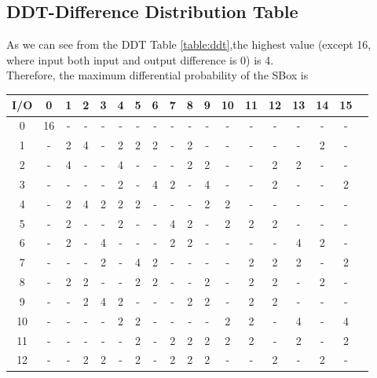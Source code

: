 \documentclass[preprint]{transcrypto}
\begin{document}
\subsection{DDT-Difference Distribution Table}
As we can see from the DDT Table \ref{table:ddt},the highest value (except 16, where input both input and output difference is 0) is 4.\\
Therefore, the maximum differential probability of the SBox is \\
\begin{table}[H]
	\begin{center}
	\begin{tabular}{||c||c|c|c|c|c|c|c|c|c|c|c|c|c|c|c|c|c|}
	    \hline
	    I/O & 0 & 1 & 2 & 3 & 4 & 5 & 6 & 7 & 8 & 9 & 10 & 11 & 12 & 13 & 14 & 15\\
		\hline
		\hline
		0 & 16 &  - &  - &  - &  - &  - &  - &  - &  - &  - &  - &  - &  - &  - &  - &  - \\
        \hline
        1 &  - & 2 & 4 &  - & 2 & 2 & 2 &  - & 2 &  - &  - &  - &  - &  - & 2 &  - \\
        \hline
        2 &  - & 4 &  - &  - & 4 &  - &  - &  - & 2 & 2 &  - &  - & 2 & 2 &  - &  - \\
        \hline
        3 &  - &  - &  - &  - & 2 &  - & 4 & 2 &  - & 4 &  - &  - & 2 &  - &  - & 2 \\
        \hline
        4 &  - & 2 & 4 & 2 & 2 & 2 &  - &  - &  - & 2 & 2 &  - &  - &  - &  - &  - \\
        \hline
        5 &  - & 2 &  - &  - & 2 &  - &  - & 4 & 2 &  - & 2 & 2 & 2 &  - &  - &  - \\
        \hline
        6 &  - & 2 &  - & 4 &  - &  - &  - & 2 & 2 &  - &  - &  - &  - & 4 & 2 &  - \\
        \hline
        7 &  - &  - &  - & 2 &  - & 4 & 2 &  - &  - &  - &  - & 2 & 2 & 2 &  - & 2 \\
        \hline
        8 &  - & 2 & 2 &  - &  - & 2 & 2 &  - &  - & 2 &  - & 2 & 2 &  - & 2 &  - \\
        \hline
        9 &  - &  - & 2 & 4 & 2 &  - &  - &  - & 2 & 2 &  - & 2 & 2 &  - &  - &  - \\
        \hline
        10 &  - &  - &  - &  - & 2 & 2 &  - &  - &  - &  - & 2 & 2 &  - & 4 &  - & 4 \\
        \hline
        11 &  - &  - &  - &  - &  - & 2 &  - & 2 & 2 & 2 & 2 & 2 &  - & 2 &  - & 2 \\
        \hline
        12 &  - &  - & 2 & 2 &  - & 2 &  - & 2 & 2 & 2 &  - &  - & 2 &  - & 2 &  - \\

\end{tabular}
\end{center}
\end{table}
\end{document}
